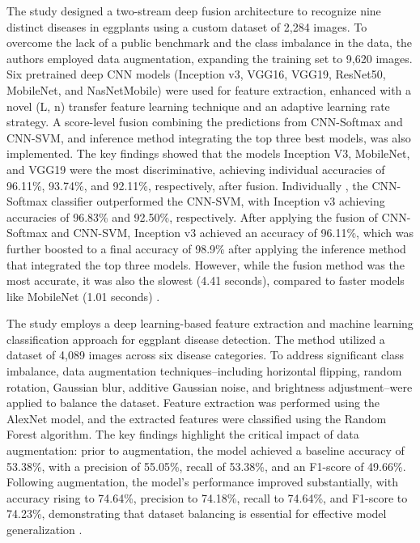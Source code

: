 {

The study designed a two-stream deep fusion architecture to recognize nine distinct diseases in eggplants using a custom dataset of 2,284 images. To overcome the lack of a public benchmark and the class imbalance in the data, the authors employed data augmentation, expanding the training set to 9,620 images. Six pretrained deep CNN models (Inception v3, VGG16, VGG19, ResNet50, MobileNet, and NasNetMobile) were used for feature extraction, enhanced with a novel (L, n) transfer feature learning technique and an adaptive learning rate strategy. A score-level fusion combining the predictions from CNN-Softmax and CNN-SVM, and inference method integrating the top three best models, was also implemented. The key findings showed that the models Inception V3, MobileNet, and VGG19 were the most discriminative, achieving individual accuracies of 96.11\%, 93.74\%, and 92.11\%, respectively, after fusion. Individually , the CNN-Softmax classifier outperformed the CNN-SVM, with Inception v3 achieving accuracies of 96.83\%  and 92.50\%, respectively. After applying the fusion of CNN-Softmax and CNN-SVM, Inception v3 achieved an accuracy of 96.11\%, which was further boosted to a final accuracy of 98.9\% after applying the inference method that integrated the top three models. However, while the fusion method was the most accurate, it was also the slowest (4.41 seconds), compared to faster models like MobileNet (1.01 seconds) \citep{haque2022deepnetwork}.


The study employs a deep learning-based feature extraction and machine learning classification approach for eggplant disease detection. The method utilized a dataset of 4,089 images across six disease categories. To address significant class imbalance, data augmentation techniques–including horizontal flipping, random rotation, Gaussian blur, additive Gaussian noise, and brightness adjustment–were applied to balance the dataset. Feature extraction was performed using the AlexNet model, and the extracted features were classified using the Random Forest algorithm. The key findings highlight the critical impact of data augmentation: prior to augmentation, the model achieved a baseline accuracy of 53.38\%, with a precision of 55.05\%, recall of 53.38\%, and an F1-score of 49.66\%. Following augmentation, the model’s performance improved substantially, with accuracy rising to 74.64\%, precision to 74.18\%, recall to 74.64\%, and F1-score to 74.23\%, demonstrating that dataset balancing is essential for effective model generalization \citep{kursun2025conference}.

}
